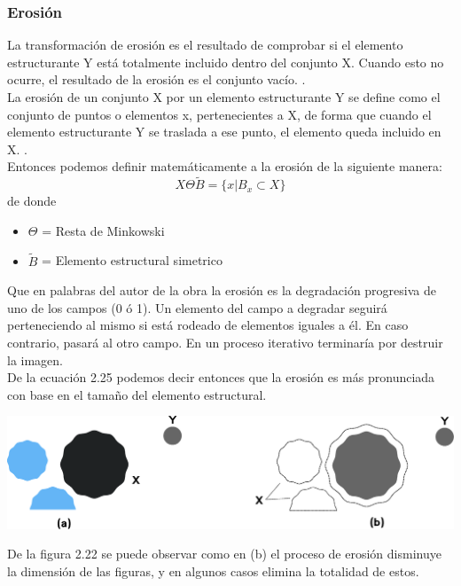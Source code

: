 \subsubsection{Erosión}
La transformación de erosión es el resultado de comprobar si el elemento estructurante
Y está totalmente incluido dentro del conjunto X. Cuando esto no ocurre, el resultado de la
erosión es el conjunto vacío. \cite{10045_10053}.\\
La erosión de un conjunto X por un elemento estructurante Y se define como el conjunto
de puntos o elementos x, pertenecientes a X, de forma que cuando el elemento estructurante Y se
traslada a ese punto, el elemento queda incluido en X. \cite{10045_10053}.\\
Entonces podemos definir matemáticamente a la erosión de la siguiente manera:
\begin{equation}
	X \Theta \tilde{B} = \{ x|B_x \subset X \}
\end{equation}
de donde
\begin{itemize}
	\item $\Theta$ = Resta de Minkowski
	\item $\tilde{B}$ = Elemento estructural simetrico
\end{itemize}
Que en palabras del autor de la obra \cite{Book:Arturo2011} la erosión es la degradación progresiva de uno de los campos (0 ó 1). Un elemento del
campo a degradar seguirá perteneciendo al mismo si está rodeado de elementos iguales
a él. En caso contrario, pasará al otro campo. En un proceso iterativo terminaría por
destruir la imagen.\\
De la ecuación 2.25 podemos decir entonces que la erosión es más pronunciada con base en el tamaño del elemento estructural.
\begin{center}
	\includegraphics[width=0.9 \textwidth]{Contenido/Cuerpo/Capitulo2/Fig14.eps}
	\label{fig:MarcoTeorico:Fig23}
\end{center}
De la figura 2.22 se puede observar como en (b) el proceso de erosión disminuye la dimensión de las figuras, y en algunos casos elimina la totalidad de estos.

